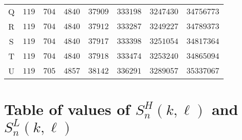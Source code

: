 \documentclass[11pt]{amsart}
\theoremstyle{definition}
\begin{document}
\begin{center}
\begin{tabular}{|crrrrrrr|}
Q & $119$ & $704$ & $4840$ & $37909$ & $333198$ & $3247430$ & $34756773$ \\
R & $119$ & $704$ & $4840$ & $37912$ & $333287$ & $3249227$ & $34789373$ \\
S & $119$ & $704$ & $4840$ & $37917$ & $333398$ & $3251054$ & $34817364$ \\
T & $119$ & $704$ & $4840$ & $37918$ & $333474$ & $3253240$ & $34865094$ \\
U & $119$ & $705$ & $4857$ & $38142$ & $336291$ & $3289057$ & $35337067$ \\
		\hline
	\end{tabular}
\end{center}

\newpage

\section{Table of values of $S^H_n(k, \ell)$ and $S^L_n(k,\ell)$}
\label{sec:SHLchart}
\small
\end{document}
